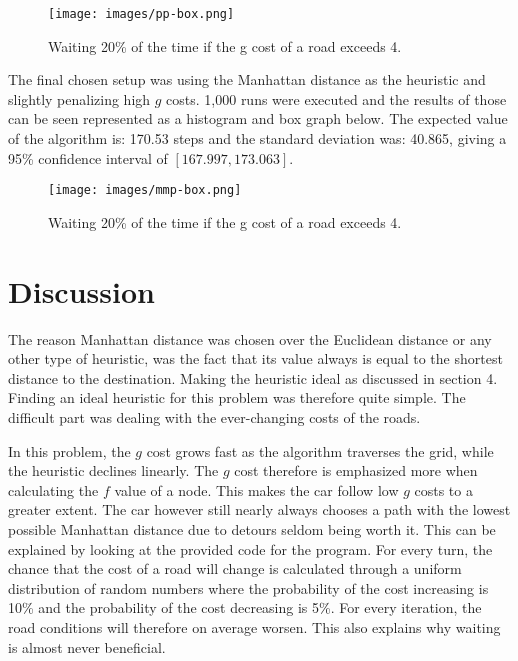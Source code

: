 \documentclass[12pt, a4paper]{article}
\begin{document}
\begin{figure}[!ht]
\centering
\texttt{[image: images/pp-box.png]}\\
\caption{Waiting 20\% of the time if the g cost of a road exceeds 4.}
\label{pp-box}
\end{figure}
\vspace{2.5mm}

The final chosen setup was using the Manhattan distance as the heuristic and slightly penalizing high $g$ costs. 1,000 runs were executed and the results of those can be seen represented as a histogram and box graph below. The expected value of the algorithm is: 170.53 steps and the standard deviation was: 40.865, giving a 95\% confidence interval of $[167.997, 173.063]$.


\begin{figure}[!ht]
\centering
\texttt{[image: images/mmp-box.png]}\\
\caption{Waiting 20\% of the time if the g cost of a road exceeds 4.}
\label{mmp-box}
\end{figure}
\vspace{2.5mm}


\section{Discussion}
The reason Manhattan distance was chosen over the Euclidean distance or any other type of heuristic, was the fact that its value always is equal to the shortest distance to the destination. Making the heuristic ideal as discussed in section 4. Finding an ideal heuristic for this problem was therefore quite simple. The difficult part was dealing with the ever-changing costs of the roads.

In this problem, the $g$ cost grows fast as the algorithm traverses the grid, while the heuristic declines linearly. The $g$ cost therefore is emphasized more when calculating the $f$ value of a node. This makes the car follow low $g$ costs to a greater extent. The car however still nearly always chooses a path with the lowest possible Manhattan distance due to detours seldom being worth it. This can be explained by looking at the provided code for the program. For every turn, the chance that the cost of a road will change is calculated through a uniform distribution of random numbers where the probability of the cost increasing is 10\% and the probability of the cost decreasing is 5\%. For every iteration, the road conditions will therefore on average worsen. This also explains why waiting is almost never beneficial.
\end{document}
